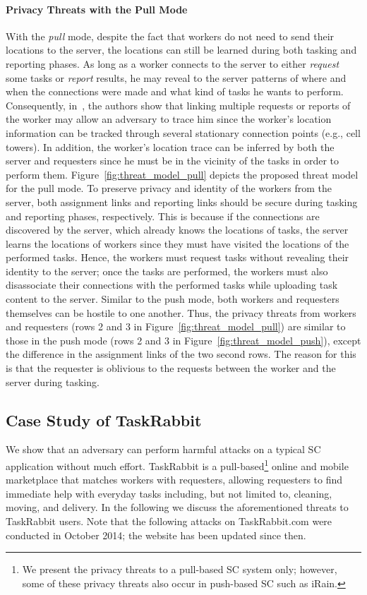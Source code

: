 \documentclass{USC-Thesis}
\numberwithin{equation}{chapter}
\begin{document}
\paragraph{\textbf{Privacy Threats with the Pull Mode}}

With the \emph{pull} mode, despite the fact that workers do not need to send their locations to the server, the locations can still be learned during both tasking and reporting phases. As long as a worker connects to the server to either \emph{request} some tasks or \emph{report} results, he may reveal to the server patterns of where and when the connections were made and what kind of tasks he wants to perform. Consequently, in~\cite{Shin2011}, the authors show that linking multiple requests or reports of the worker may allow an adversary to trace him since the worker's location information can be tracked through several stationary connection points (e.g., cell towers). In addition, the worker's location trace can be inferred by both the server and requesters since he must be in the vicinity of the tasks in order to perform them.
Figure~\ref{fig:threat_model_pull} depicts the proposed threat model for the pull mode. To preserve privacy and identity of the workers from the server, both assignment links and reporting links should be secure during tasking and reporting phases, respectively. This is because if the connections are discovered by the server, which already knows the locations of tasks, the server learns the locations of workers since they must have visited the locations of the performed tasks. Hence, the workers must request tasks without revealing their identity to the server; once the tasks are performed, the workers must also disassociate their connections with the performed tasks while uploading task content to the server.
Similar to the push mode, both workers and requesters themselves can be hostile to one another.
Thus, the privacy threats from workers and requesters (rows 2 and 3 in Figure~\ref{fig:threat_model_pull}) are similar to those in the push mode (rows 2 and 3 in Figure~\ref{fig:threat_model_push}), except the difference in the assignment links of the two second rows. The reason for this is that the requester is oblivious to the requests between the worker and the server during tasking.

\subsection{Case Study of TaskRabbit}
\label{sec:tasktabbit}
We show that an adversary can perform harmful attacks on a typical SC application without much effort. TaskRabbit is a pull-based\footnote{We present the privacy threats to a pull-based SC system only; however, some of these privacy threats also occur in push-based SC such as iRain.} online and mobile marketplace that matches workers with requesters, allowing requesters to find immediate help with everyday tasks including, but not limited to, cleaning, moving, and delivery. In the following we discuss the aforementioned threats to TaskRabbit  users. Note that the following attacks on TaskRabbit.com were conducted in October 2014; the website has been updated since then.
\end{document}
